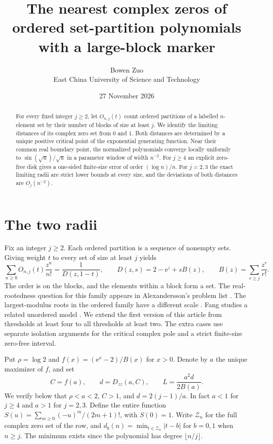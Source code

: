 \documentclass[11pt]{article}
\title{The nearest complex zeros of ordered set-partition polynomials with a large-block marker}
\author{Bowen Zuo\\\small East China University of Science and Technology}
\date{27 November 2026}
\newcommand{\ee}{\mathrm e}
\begin{document}
\maketitle
\begin{abstract}
For every fixed integer $j\ge2$, let $O_{n,j}(t)$ count ordered partitions of a labelled $n$-element set by their number of blocks of size at least $j$. We identify the limiting distances of its complex zero set from $0$ and $1$. Both distances are determined by a unique positive critical point of the exponential generating function. Near their common real boundary point, the normalized polynomials converge locally uniformly to $\sin(\sqrt u)/\sqrt u$ in a parameter window of width $n^{-2}$. For $j\ge4$ an explicit zero-free disk gives a one-sided finite-size error of order $(\log n)/n$. For $j=2,3$ the exact limiting radii are strict lower bounds at every size, and the deviations of both distances are $O_j(n^{-2})$.
\end{abstract}

\section{The two radii}
Fix an integer $j\ge2$. Each ordered partition is a sequence of nonempty sets. Giving weight $t$ to every set of size at least $j$ yields
\begin{equation}\label{egf}
 \sum_{n\ge0}O_{n,j}(t)\frac{z^n}{n!}
 =\frac1{D(z,1-t)},\qquad
 D(z,s)=2-\ee^z+s B(z),\qquad B(z)=\sum_{r\ge j}\frac{z^r}{r!}.
\end{equation}
The order is on the blocks, and the elements within a block form a set. The real-rootedness question for this family appears in Alexandersson's problem list \cite{symcat}. The largest-modulus roots in the ordered family have a different scale \cite{outer}. Fang studies a related unordered model \cite{fang}. We extend the first version of this article \cite{first} from thresholds at least four to all thresholds at least two. The extra cases use separate isolation arguments for the critical complex pole and a strict finite-size zero-free interval.

Put $\rho=\log 2$ and $f(x)=(\ee^x-2)/B(x)$ for $x>0$. Denote by $a$ the unique maximizer of $f$, and set
\[
 C=f(a),\qquad d=D_{zz}(a,C),\qquad L=\frac{a^2d}{2B(a)}.
\]
We verify below that $\rho<a<2$, $C>1$, and $d=2(j-1)/a$. In fact $a<1$ for $j\ge4$ and $a>1$ for $j=2,3$. Define the entire function $S(u)=\sum_{m\ge0}(-u)^m/(2m+1)!$, with $S(0)=1$. Write $\mathcal Z_n$ for the full complex zero set of the row, and $d_b(n)=\min_{t\in\mathcal Z_n}|t-b|$ for $b=0,1$ when $n\ge j$. The minimum exists since the polynomial has degree $\lfloor n/j\rfloor$.
\end{document}
